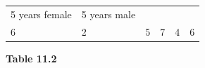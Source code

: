 \begin{enumerate}[noitemsep, label=\textbf{\arabic*}. ]
{{\begin{center}
\begin{tabular}[t]{|l|l|l|l|l|l|}
        5 years female &
        5 years male%
     \tabularnewline\cline{1-1}\cline{2-2}\cline{3-3}\cline{4-4}\cline{5-5}\cline{6-6}
        6 &
        2 &
        5 &
        7 &
        4 &
        6%
     \tabularnewline\cline{1-1}\cline{2-2}\cline{3-3}\cline{4-4}\cline{5-5}\cline{6-6}
    \end{tabular}
      \end{center}
    \begin{center}{\small\bfseries Table 11.2}\end{center}
          }{ %
        \begin{center}
      \label{m39377*id115116}
    \noindent
\end{center}}}
\end{enumerate}
